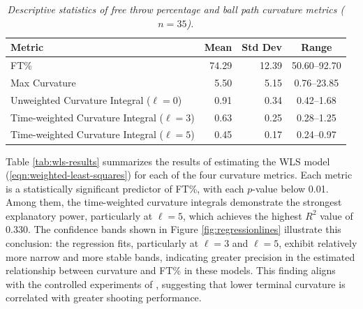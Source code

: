 \documentclass{article}
\begin{document}
    \begin{table}[H]
        \centering
        \begin{tabular}{lrrc}
        \toprule
        \textbf{Metric} & \textbf{Mean} & \textbf{Std Dev} & \textbf{Range} \\
        \midrule
        FT\% & 74.29 & 12.39 & 50.60--92.70 \\
        Max Curvature & 5.50 & 5.15 & 0.76--23.85 \\
        Unweighted Curvature Integral ($\ell=0$) & 0.91 & 0.34 & 0.42--1.68 \\
        Time-weighted Curvature Integral ($\ell=3$) & 0.63 & 0.25 & 0.28--1.25 \\
        Time-weighted Curvature Integral ($\ell=5$) & 0.45 & 0.17 & 0.24--0.97 \\
        \bottomrule
        \end{tabular}
        \caption{\it Descriptive statistics of free throw percentage and ball path curvature metrics ($n = 35$).}
        \label{tab:summary-stats}
    \end{table}

    Table \ref{tab:wls-results} summarizes the results of estimating the WLS model (\ref{eqn:weighted-least-squares}) for each of the four curvature metrics. Each metric is a statistically significant predictor of FT\%, with each $p$-value below 0.01. Among them, the time-weighted curvature integrals demonstrate the strongest explanatory power, particularly at $\ell = 5$, which achieves the highest $R^2$ value of 0.330. The confidence bands shown in Figure \ref{fig:regressionlines} illustrate this conclusion: the regression fits, particularly at $\ell = 3$ and $\ell = 5$, exhibit relatively more narrow and more stable bands, indicating greater precision in the estimated relationship between curvature and FT\% in these models. This finding aligns with the controlled experiments of \citet{slegers_role_2024}, suggesting that lower terminal curvature is correlated with greater shooting performance.
\end{document}
